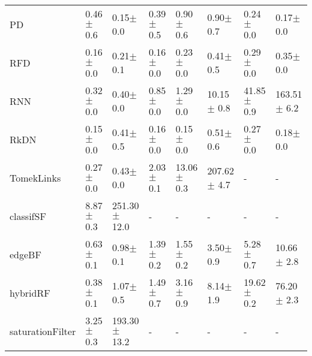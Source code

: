 \begin{tabular}{llllllll}
PD               &   0.46$\pm$ 0.6 &     0.15$\pm$ 0.0 &     0.39$\pm$ 0.5 &    0.90$\pm$ 0.6 &     0.90$\pm$ 0.7 &   0.24$\pm$ 0.0 &    0.17$\pm$ 0.0 \\
RFD              &   0.16$\pm$ 0.0 &     0.21$\pm$ 0.1 &     0.16$\pm$ 0.0 &    0.23$\pm$ 0.0 &     0.41$\pm$ 0.5 &   0.29$\pm$ 0.0 &    0.35$\pm$ 0.0 \\
RNN              &   0.32$\pm$ 0.0 &     0.40$\pm$ 0.0 &     0.85$\pm$ 0.0 &    1.29$\pm$ 0.0 &    10.15$\pm$ 0.8 &  41.85$\pm$ 0.9 &  163.51$\pm$ 6.2 \\
RkDN             &   0.15$\pm$ 0.0 &     0.41$\pm$ 0.5 &     0.16$\pm$ 0.0 &    0.15$\pm$ 0.0 &     0.51$\pm$ 0.6 &   0.27$\pm$ 0.0 &    0.18$\pm$ 0.0 \\
TomekLinks       &   0.27$\pm$ 0.0 &     0.43$\pm$ 0.0 &     2.03$\pm$ 0.1 &   13.06$\pm$ 0.3 &   207.62$\pm$ 4.7 &               - &                - \\
classifSF        &   8.87$\pm$ 0.3 &  251.30$\pm$ 12.0 &                 - &                - &                 - &               - &                - \\
edgeBF           &   0.63$\pm$ 0.1 &     0.98$\pm$ 0.1 &     1.39$\pm$ 0.2 &    1.55$\pm$ 0.2 &     3.50$\pm$ 0.9 &   5.28$\pm$ 0.7 &   10.66$\pm$ 2.8 \\
hybridRF         &   0.38$\pm$ 0.1 &     1.07$\pm$ 0.5 &     1.49$\pm$ 0.7 &    3.16$\pm$ 0.9 &     8.14$\pm$ 1.9 &  19.62$\pm$ 0.2 &   76.20$\pm$ 2.3 \\
saturationFilter &   3.25$\pm$ 0.3 &  193.30$\pm$ 13.2 &                 - &                - &                 - &               - &                - \\
\bottomrule
\end{tabular}
